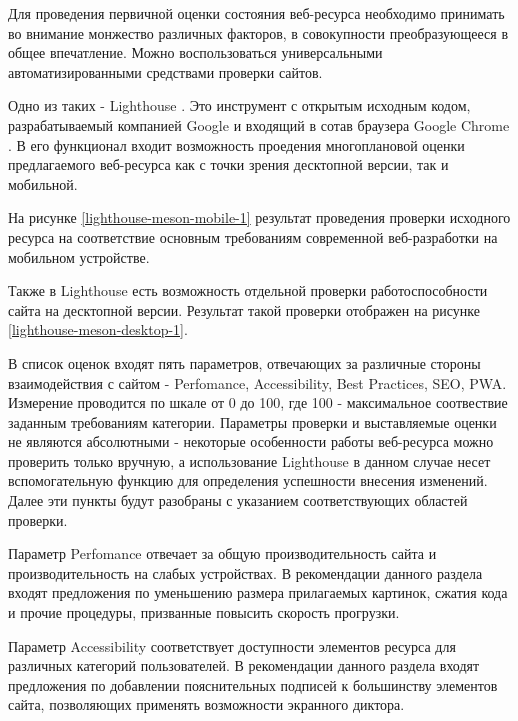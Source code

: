 Для проведения первичной оценки состояния веб-ресурса необходимо принимать во внимание монжество различных факторов, в совокупности преобразующееся в общее впечатление.
Можно воспользоваться универсальными автоматизированными средствами проверки сайтов.

Одно из таких - Lighthouse \cite{lighthouse}.
Это инструмент с открытым исходным кодом, разрабатываемый компанией Google \cite{google} и входящий в сотав браузера Google Chrome \cite{chrome}.
В его функционал входит возможность проедения многоплановой оценки предлагаемого веб-ресурса как с точки зрения десктопной версии, так и мобильной.

На рисунке \ref{lighthouse-meson-mobile-1} результат проведения проверки исходного ресурса на соответствие основным требованиям современной веб-разработки на мобильном устройстве.


Также в Lighthouse есть возможность отдельной проверки работоспособности сайта на десктопной версии.
Результат такой проверки отображен на рисунке \ref{lighthouse-meson-desktop-1}.


В список оценок входят пять параметров, отвечающих за различные стороны взаимодействия с сайтом - Perfomance, Accessibility, Best Practices, SEO, PWA.
Измерение проводится по шкале от 0 до 100, где 100 - максимальное соотвествие заданным требованиям категории.
Параметры проверки и выставляемые оценки не являются абсолютными - некоторые особенности работы веб-ресурса можно проверить только вручную, а использование Lighthouse в данном случае несет вспомогательную функцию для определения успешности внесения изменений.
Далее эти пункты будут разобраны с указанием соответствующих областей проверки.

Параметр Perfomance отвечает за общую производительность сайта и производительность на слабых устройствах.
В рекомендации данного раздела входят предложения по уменьшению размера прилагаемых картинок, сжатия кода и прочие процедуры, призванные повысить скорость прогрузки.

Параметр Accessibility соответствует доступности элементов ресурса для различных категорий пользователей.
В рекомендации данного раздела входят предложения по добавлении пояснительных подписей к большинству элементов сайта, позволяющих применять возможности экранного диктора.

